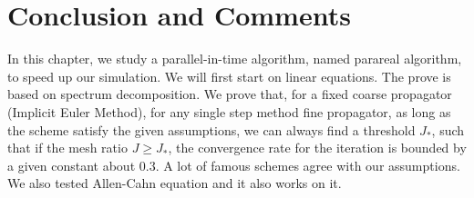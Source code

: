 \documentclass[a4paper, oneside]{book}
\begin{document}
\section{Conclusion and Comments}
In this chapter, we study a parallel-in-time algorithm, named parareal algorithm, to speed up our simulation. We will first start on linear equations. The prove is based on spectrum decomposition. We prove that, for a fixed coarse propagator (Implicit Euler Method), for any single step method fine propagator, as long as the scheme satisfy the given assumptions, we can always find a threshold $J_*$, such that if the mesh ratio $J\geq J_*$, the convergence rate for the iteration is bounded by a given constant about $0.3$. A lot of famous schemes agree with our assumptions. We also tested Allen-Cahn equation and it also works on it. 
\end{document}
